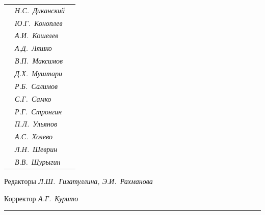 \begin{tabular}{p{63mm}p{40mm}p{50mm}}
                               &   \it Н.С.~Диканский & \\


                               &   \it Ю.Г.~Коноплев & \\


                               &   \it А.И.~Кошелев  & \\


                               &   \it А.Д.~Ляшко  & \\


                               &   \it В.П.~Максимов  & \\


                               &   \it Д.Х.~Муштари & \\


                               &   \it Р.Б.~Салимов  & \\


                               &   \it С.Г.~Самко  & \\


                               &   \it Р.Г.~Стронгин  & \\


                               &   \it П.Л.~Ульянов  & \\


                               &   \it А.С.~Холево  & \\


                               &   \it Л.Н.~Шеврин  & \\


                               &   \it В.В.~Шурыгин  & \\


\end{tabular} 


\bigskip 


\bigskip 


\bigskip 





 


\centerline{Редакторы \it Л.Ш.~Гизатуллина, Э.И.~Рахманова}


\centerline{Корректор \it А.Г.~Курито}


\bigskip 


\hrule 


\setlength{\hoffset}{-23mm}


\bigskip


